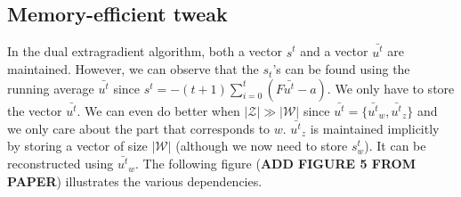\documentclass{article}
\begin{document}
\subsection{Memory-efficient tweak}
In the dual extragradient algorithm, both a vector $s^t$ and a vector
$\bar{u^t}$ are maintained. However, we can observe that the $s_t$'s can be
found using the running average $\bar{u^t}$ since $s^t = -(t + 1 ) \sum_{i=0}^t
(F \bar{u^t} - a)$. We only have to store the vector $\bar{u^t}$. We can even do
better when $|\mathcal{Z}| \gg |\mathcal{W}|$ since $\bar{u^t} = \{
\bar{u^t}_w,\bar{u^t}_z \}$ and we only care about the part that corresponds to
$w$. $\bar{u^t}_z$ is maintained implicitly by storing a vector of size
$|\mathcal{W}|$ (although we now need to store $s_w^t$). It can be reconstructed
using $\bar{u^t}_w$. The following figure (\textbf{ADD FIGURE 5 FROM PAPER})
illustrates the various dependencies.
\end{document}

